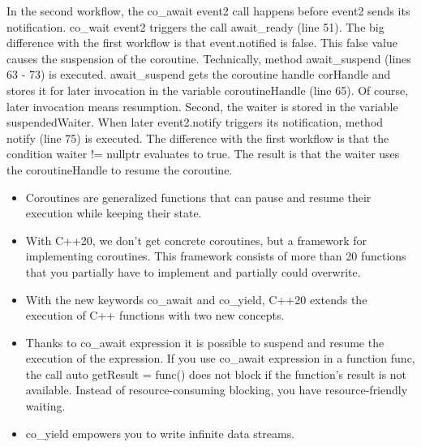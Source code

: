 In the second workflow, the co\_await event2 call happens before event2 sends its notification. co\_wait event2 triggers the call await\_ready (line 51). The big difference with the first workflow is that event.notified is false. This false value causes the suspension of the coroutine. Technically, method await\_suspend (lines 63 - 73) is executed. await\_suspend gets the coroutine handle corHandle and stores it for later invocation in the variable coroutineHandle (line 65). Of course, later invocation means resumption. Second, the waiter is stored in the variable suspendedWaiter. When later event2.notify triggers its notification, method notify (line 75) is executed. The difference with the first workflow is that the condition waiter != nullptr evaluates to true. The result is that the waiter uses the coroutineHandle to resume the coroutine.

\begin{tcolorbox}[breakable,enhanced jigsaw,colback=mygreen!5!white,colframe=mygreen!75!black,title={Distilled Information}]
	
\begin{itemize}
\item 
Coroutines are generalized functions that can pause and resume their execution while keeping their state.

\item 
With C++20, we don’t get concrete coroutines, but a framework for implementing coroutines. This framework consists of more than 20 functions that you partially have to implement and partially could overwrite.

\item 
With the new keywords co\_await and co\_yield, C++20 extends the execution of C++ functions with two new concepts.

\item 
Thanks to co\_await expression it is possible to suspend and resume the execution of the expression. If you use co\_await expression in a function func, the call auto getResult = func() does not block if the function’s result is not available. Instead of resource-consuming blocking, you have resource-friendly waiting.

\item 
co\_yield empowers you to write infinite data streams.

\end{itemize}

\end{tcolorbox}



























